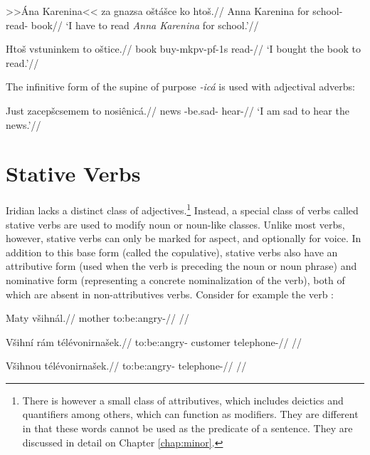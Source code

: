 	\pex
\begingl
\gla >>Ána Karenina<< za gnazsa o\v{s}tá\v{s}ce ko hto\v{s}.//
\glb Anna Karenina for school- read-  book//
\glft `I have to read \textit{Anna Karenina} for school.'//
\endgl
\xe

	\pex
\begingl
\gla Hto\v{s} vstuninkem to o\v{s}tice.//
\glb book buy-mk{pv-pf-1s}  read-//
\glft `I bought the book to read.'//
\endgl
\xe

\par The infinitive form of the supine of purpose \textit{-icá} is used with adjectival adverbs:

\pex
\begingl
\gla Just zacep\v{s}csemem to nosiênicá.//
\glb news -be.sad-  hear-//
\glft `I am sad to hear the news.'//
\endgl
\xe


\section{Stative Verbs}

Iridian lacks a distinct class of adjectives.\footnote{There is however a small class of attributives, which includes deictics and quantifiers among others, which can function as modifiers. They are different in that these words cannot be used as the predicate of a sentence. They are discussed in detail on Chapter \ref{chap:minor}.} Instead, a special class of verbs called stative verbs are used to modify noun or noun-like classes. Unlike most verbs, however, stative verbs can only be marked for aspect, and optionally for voice. In addition to this base form (called the copulative), stative verbs also have an attributive form (used when the verb is preceding the noun or noun phrase) and nominative form (representing a concrete nominalization of the verb), both of which are absent in non-attributives verbs. Consider for example the verb  :

\pex
\a
\begingl
\gla Maty v\v{s}ihn\'al.//
\glb mother to:be:angry-//
\glft {}//
\endgl

\a
\begingl
\gla V\v{s}ihn\'i r\'am t\'el\'evonirna\v{s}ek.//
\glb to:be:angry- customer telephone-//
\glft {}//
\endgl

\a
\begingl
\gla V\v{s}ihnou t\'el\'evonirna\v{s}ek.//
\glb to:be:angry- telephone-//
\glft {}//
\endgl

